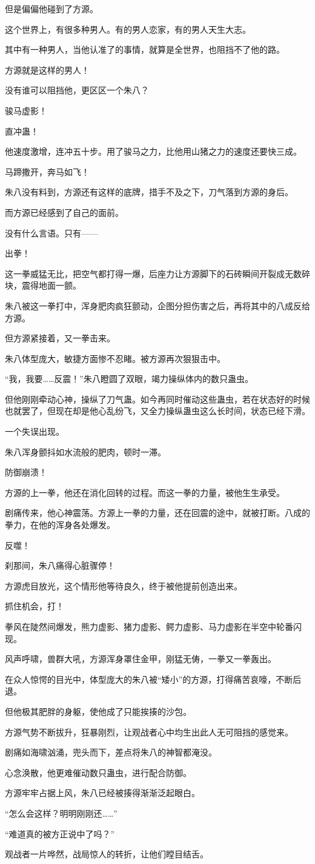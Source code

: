 \begin{this_body}
但是偏偏他碰到了方源。

这个世界上，有很多种男人。有的男人恋家，有的男人天生大志。

其中有一种男人，当他认准了的事情，就算是全世界，也阻挡不了他的路。

方源就是这样的男人！

没有谁可以阻挡他，更区区一个朱八？

骏马虚影！

直冲蛊！

他速度激增，连冲五十步。用了骏马之力，比他用山猪之力的速度还要快三成。

马蹄撒开，奔马如飞！

朱八没有料到，方源还有这样的底牌，措手不及之下，刀气落到方源的身后。

而方源已经感到了自己的面前。

没有什么言语。只有——

出拳！

这一拳威猛无比，把空气都打得一爆，后座力让方源脚下的石砖瞬间开裂成无数碎块，震得地面一颤。

朱八被这一拳打中，浑身肥肉疯狂颤动，企图分担伤害之后，再将其中的八成反给方源。

但方源紧接着，又一拳击来。

朱八体型庞大，敏捷方面惨不忍睹。被方源再次狠狠击中。

“我，我要……反震！”朱八瞪圆了双眼，竭力操纵体内的数只蛊虫。

但他刚刚牵动心神，操纵了刀气蛊。如今再同时催动这些蛊虫，若在状态好的时候也就罢了，但现在却是他心乱纷飞，又全力操纵蛊虫这么长时间，状态已经下滑。

一个失误出现。

朱八浑身颤抖如水流般的肥肉，顿时一滞。

防御崩溃！

方源的上一拳，他还在消化回转的过程。而这一拳的力量，被他生生承受。

剧痛传来，他心神震荡。方源上一拳的力量，还在回震的途中，就被打断。八成的拳力，在他的浑身各处爆发。

反噬！

刹那间，朱八痛得心脏骤停！

方源虎目放光，这个情形他等待良久，终于被他提前创造出来。

抓住机会，打！

拳风在陡然间爆发，熊力虚影、猪力虚影、鳄力虚影、马力虚影在半空中轮番闪现。

风声呼啸，兽群大吼，方源浑身罩住金甲，刚猛无俦，一拳又一拳轰出。

在众人惊愕的目光中，体型庞大的朱八被“矮小”的方源，打得痛苦哀嚎，不断后退。

但他极其肥胖的身躯，使他成了只能挨揍的沙包。

方源气势不断拔升，狂暴刚烈，让观战者心中均生出此人无可阻挡的感觉来。

剧痛如海啸汹涌，兜头而下，差点将朱八的神智都淹没。

心念涣散，他更难催动数只蛊虫，进行配合防御。

方源牢牢占据上风，朱八已经被揍得渐渐泛起眼白。

“怎么会这样？明明刚刚还……”

“难道真的被方正说中了吗？”

观战者一片哗然，战局惊人的转折，让他们瞠目结舌。

\end{this_body}

